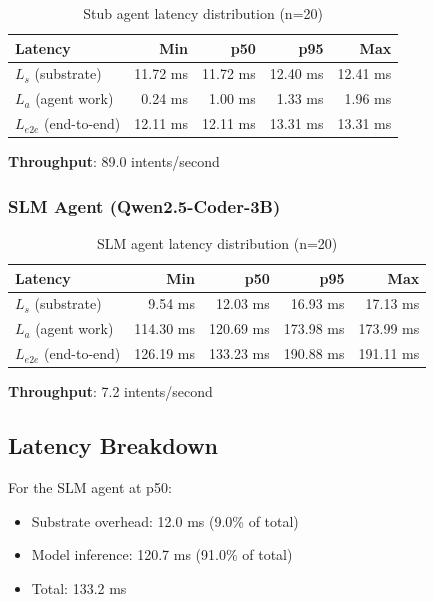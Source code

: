 \documentclass[11pt]{article}
\begin{document}
\begin{table}[h]
\centering
\small
\begin{tabular}{lrrrr}
\toprule
\textbf{Latency} & \textbf{Min} & \textbf{p50} & \textbf{p95} & \textbf{Max} \\
\midrule
$L_s$ (substrate) & 11.72 ms & 11.72 ms & 12.40 ms & 12.41 ms \\
$L_a$ (agent work) & 0.24 ms & 1.00 ms & 1.33 ms & 1.96 ms \\
$L_{e2e}$ (end-to-end) & 12.11 ms & 12.11 ms & 13.31 ms & 13.31 ms \\
\bottomrule
\end{tabular}
\caption{Stub agent latency distribution (n=20)}
\end{table}

\textbf{Throughput}: 89.0 intents/second

\subsubsection{SLM Agent (Qwen2.5-Coder-3B)}

\begin{table}[h]
\centering
\small
\begin{tabular}{lrrrr}
\toprule
\textbf{Latency} & \textbf{Min} & \textbf{p50} & \textbf{p95} & \textbf{Max} \\
\midrule
$L_s$ (substrate) & 9.54 ms & 12.03 ms & 16.93 ms & 17.13 ms \\
$L_a$ (agent work) & 114.30 ms & 120.69 ms & 173.98 ms & 173.99 ms \\
$L_{e2e}$ (end-to-end) & 126.19 ms & 133.23 ms & 190.88 ms & 191.11 ms \\
\bottomrule
\end{tabular}
\caption{SLM agent latency distribution (n=20)}
\end{table}

\textbf{Throughput}: 7.2 intents/second

\subsection{Latency Breakdown}

For the SLM agent at p50:
\begin{itemize}
\item Substrate overhead: 12.0 ms (9.0\% of total)
\item Model inference: 120.7 ms (91.0\% of total)
\item Total: 133.2 ms
\end{itemize}
\end{document}
